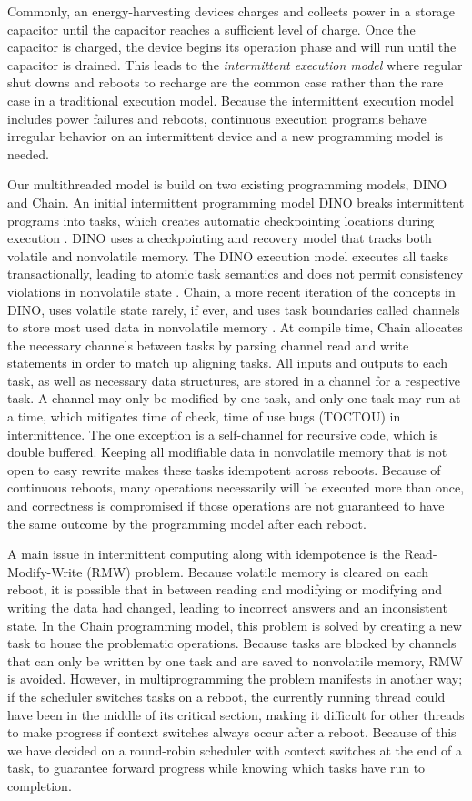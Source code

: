 \documentclass[11pt]{sensys-proc}
\begin{document}
Commonly, an energy-harvesting devices charges and collects power in a storage
capacitor until the capacitor reaches a sufficient level of charge.  Once the
capacitor is charged, the device begins its operation phase and will run until
the capacitor is drained.  This leads to the \textit{intermittent execution
model} where regular shut downs and reboots to recharge are the common case
rather than the rare case in a traditional execution model. Because the
intermittent execution model includes power failures and reboots, continuous
execution programs behave irregular behavior on an intermittent device and a new
programming model is needed.

Our multithreaded model is build on two existing programming models, DINO and
Chain.  An initial intermittent programming model DINO breaks intermittent
programs into tasks, which creates automatic checkpointing locations during
execution \cite{Dino}. DINO uses a checkpointing and recovery model that tracks
both volatile and nonvolatile memory.  The DINO execution model executes all
tasks transactionally, leading to atomic task semantics and does not permit
consistency violations in nonvolatile state \cite{Dino}. Chain, a more recent
iteration of the concepts in DINO, uses volatile state rarely, if ever, and uses
task boundaries called channels to store most used data in nonvolatile memory
\cite{Chain}. At compile time, Chain allocates the necessary channels between
tasks by parsing channel read and write statements in order to match up aligning
tasks. All inputs and outputs to each task, as well as necessary data
structures, are stored in a channel for a respective task. A channel may only be
modified by one task, and only one task may run at a time, which mitigates time
of check, time of use bugs (TOCTOU) in intermittence.  The one exception is a
self-channel for recursive code, which is double buffered.  Keeping all
modifiable data in nonvolatile memory that is not open to easy rewrite makes
these tasks idempotent across reboots.  Because of continuous reboots, many
operations necessarily will be executed more than once, and correctness is
compromised if those operations are not guaranteed to have the same outcome by
the programming model after each reboot.

A main issue in intermittent computing along with idempotence is the
Read-Modify-Write (RMW) problem.  Because volatile memory is cleared on each
reboot, it is possible that in between reading and modifying or modifying and
writing the data had changed, leading to incorrect answers and an inconsistent
state. In the Chain programming model, this problem is solved by creating a new
task to house the problematic operations. Because tasks are blocked by channels
that can only be written by one task and are saved to nonvolatile memory, RMW is
avoided.  However, in multiprogramming the problem manifests in another way; if
the scheduler switches tasks on a reboot, the currently running thread could
have been in the middle of its critical section, making it difficult for other
threads to make progress if context switches always occur after a reboot.
Because of this we have decided on a round-robin scheduler with context switches
at the end of a task, to guarantee forward progress while knowing which tasks
have run to completion.
\end{document}
